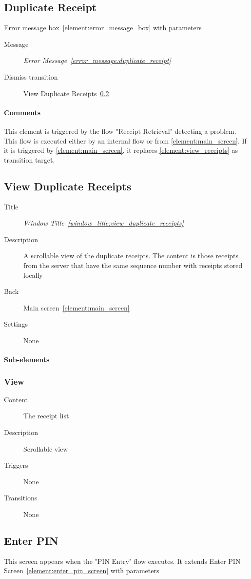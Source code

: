 \documentclass[a4paper,10pt]{article}
\newcommand{\windowTitleLabelText}{Window Title}
\newcommand{\windowTitleLabel}{window_title:}
\DeclareRobustCommand{\windowTitleRef}[1]{%
   \emph{\windowTitleLabelText~\ref{\windowTitleLabel#1}}}
\newcommand{\errorMessageLabelText}{Error Message}
\newcommand{\errorMessageLabel}{error_message:}
\DeclareRobustCommand{\errorMessageTextRef}[1]{%
   \emph{\errorMessageLabelText~\ref{\errorMessageLabel#1}}}
\newcommand{\elementLabel}{element:}
\DeclareRobustCommand{\element}[2]{\subsection{#1}\label{\elementLabel#2}}
\DeclareRobustCommand{\elementRef}[1]{\ref{\elementLabel#1}}
\begin{document}
\element{Duplicate Receipt}{duplicate_receipt}

Error message box~\elementRef{error_message_box} with parameters
\begin{description}
 \item[Message] \errorMessageTextRef{duplicate_receipt}
 \item[Dismiss transition] View Duplicate 
Receipts~\elementRef{view_duplicate_receipts}
\end{description}

\paragraph{Comments}
This element is triggered by the flow "Receipt Retrieval" detecting a problem. 
This flow is executed either by an internal flow or from 
\elementRef{main_screen}. If it is triggered by \elementRef{main_screen}, it 
replaces \elementRef{view_receipts} as transition target.

\element{View Duplicate Receipts}{view_duplicate_receipts}

\begin{description}
 \item[Title] \windowTitleRef{view_duplicate_receipts}
 \item[Description] A scrollable view of the duplicate receipts. The content is 
those receipts from the server that have the same sequence number with receipts 
stored locally
 \item[Back] Main screen~\elementRef{main_screen}
 \item[Settings] None
\end{description}

\paragraph{Sub-elements}

\subsubsection{View}
\begin{description}
 \item[Content] The receipt list
 \item[Description] Scrollable view
 \item[Triggers] None
 \item[Transitions] None
\end{description}

\element{Enter PIN}{enter_pin}
This screen appears when the "PIN Entry" flow executes. It extends Enter PIN 
Screen~\elementRef{enter_pin_screen} with parameters
\end{document}
